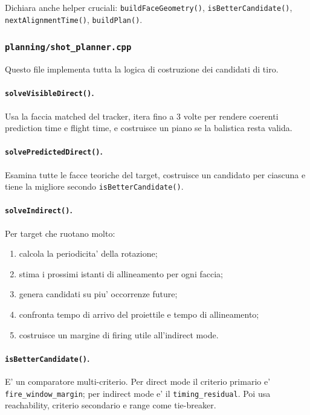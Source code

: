 \documentclass[11pt,a4paper]{article}
\newcommand{\code}[1]{\texttt{#1}}
\begin{document}
Dichiara anche helper cruciali: \code{buildFaceGeometry()}, \code{isBetterCandidate()}, \code{nextAlignmentTime()}, \code{buildPlan()}.

\subsubsection{\code{planning/shot\_planner.cpp}}

Questo file implementa tutta la logica di costruzione dei candidati di tiro.

\paragraph{\code{solveVisibleDirect()}.}
Usa la faccia matched del tracker, itera fino a 3 volte per rendere coerenti prediction time e flight time, e costruisce un piano se la balistica resta valida.

\paragraph{\code{solvePredictedDirect()}.}
Esamina tutte le facce teoriche del target, costruisce un candidato per ciascuna e tiene la migliore secondo \code{isBetterCandidate()}.

\paragraph{\code{solveIndirect()}.}
Per target che ruotano molto:
\begin{enumerate}[leftmargin=1.4em]
  \item calcola la periodicita' della rotazione;
  \item stima i prossimi istanti di allineamento per ogni faccia;
  \item genera candidati su piu' occorrenze future;
  \item confronta tempo di arrivo del proiettile e tempo di allineamento;
  \item costruisce un margine di firing utile all'indirect mode.
\end{enumerate}

\paragraph{\code{isBetterCandidate()}.}
E' un comparatore multi-criterio. Per direct mode il criterio primario e' \code{fire\_window\_margin}; per indirect mode e' il \code{timing\_residual}. Poi usa reachability, criterio secondario e range come tie-breaker.
\end{document}
